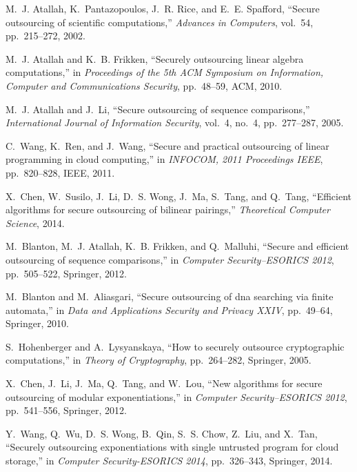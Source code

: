 \documentclass[english,draftcls,onecolumn,11pt]{IEEEtran}
\theoremstyle{definition}
\theoremstyle{plain}
\theoremstyle{plain}
\theoremstyle{definition}
\begin{document}
\begin{thebibliography}{10}

M.~J. Atallah, K.~Pantazopoulos, J.~R. Rice, and E.~E. Spafford, ``Secure
  outsourcing of scientific computations,'' {\em Advances in Computers},
  vol.~54, pp.~215--272, 2002.

M.~J. Atallah and K.~B. Frikken, ``Securely outsourcing linear algebra
  computations,'' in {\em Proceedings of the 5th ACM Symposium on Information,
  Computer and Communications Security}, pp.~48--59, ACM, 2010.

M.~J. Atallah and J.~Li, ``Secure outsourcing of sequence comparisons,'' {\em
  International Journal of Information Security}, vol.~4, no.~4, pp.~277--287,
  2005.

C.~Wang, K.~Ren, and J.~Wang, ``Secure and practical outsourcing of linear
  programming in cloud computing,'' in {\em INFOCOM, 2011 Proceedings IEEE},
  pp.~820--828, IEEE, 2011.

X.~Chen, W.~Susilo, J.~Li, D.~S. Wong, J.~Ma, S.~Tang, and Q.~Tang, ``Efficient
  algorithms for secure outsourcing of bilinear pairings,'' {\em Theoretical
  Computer Science}, 2014.

M.~Blanton, M.~J. Atallah, K.~B. Frikken, and Q.~Malluhi, ``Secure and
  efficient outsourcing of sequence comparisons,'' in {\em Computer
  Security--ESORICS 2012}, pp.~505--522, Springer, 2012.

M.~Blanton and M.~Aliasgari, ``Secure outsourcing of dna searching via finite
  automata,'' in {\em Data and Applications Security and Privacy XXIV},
  pp.~49--64, Springer, 2010.

S.~Hohenberger and A.~Lysyanskaya, ``How to securely outsource cryptographic
  computations,'' in {\em Theory of Cryptography}, pp.~264--282, Springer,
  2005.

X.~Chen, J.~Li, J.~Ma, Q.~Tang, and W.~Lou, ``New algorithms for secure
  outsourcing of modular exponentiations,'' in {\em Computer Security--ESORICS
  2012}, pp.~541--556, Springer, 2012.

Y.~Wang, Q.~Wu, D.~S. Wong, B.~Qin, S.~S. Chow, Z.~Liu, and X.~Tan, ``Securely
  outsourcing exponentiations with single untrusted program for cloud
  storage,'' in {\em Computer Security-ESORICS 2014}, pp.~326--343, Springer,
  2014.


\end{thebibliography}
\end{document}
